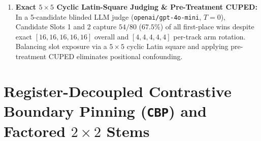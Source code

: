 \documentclass[11pt,a4paper]{article}
\begin{document}
\begin{enumerate}
  \item \textbf{Exact $5\times 5$ Cyclic Latin-Square Judging \& Pre-Treatment CUPED:} In a 5-candidate blinded LLM judge (\texttt{openai/gpt-4o-mini}, $T=0$), Candidate Slots 1 and 2 capture $54/80$ ($67.5\%$) of all first-place wins despite exact $[16,16,16,16,16]$ overall and $[4,4,4,4,4]$ per-track arm rotation. Balancing slot exposure via a $5\times 5$ cyclic Latin square and applying pre-treatment CUPED \cite{deng2013cuped} eliminates positional confounding.
\end{enumerate}

\section{Register-Decoupled Contrastive Boundary Pinning (\texttt{CBP}) and Factored $2\times 2$ Stems}
\end{document}
